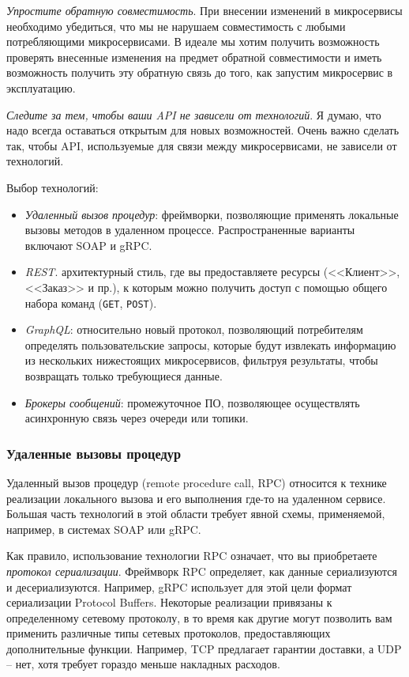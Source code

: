 \documentclass[%
	11pt,
	a4paper,
	utf8,
		]{article}
\begin{document}
\emph{Упростите обратную совместимость}. При внесении изменений в микросервисы необходимо убедиться, что мы не нарушаем совместимость с любыми потребляющими микросервисами. В идеале мы хотим получить возможность проверять внесенные изменения на предмет обратной совместимости и иметь возможность получить эту обратную связь до того, как запустим микросервис в эксплуатацию.

\emph{Следите за тем, чтобы ваши API не зависели от технологий}. Я думаю, что надо всегда оставаться открытым для новых возможностей. Очень важно сделать так, чтобы API, используемые для связи между микросервисами, не зависели от технологий.

Выбор технологий:
\begin{itemize}
	\item \emph{Удаленный вызов процедур}: фреймворки, позволяющие применять локальные вызовы методов в удаленном процессе. Распространенные варианты включают SOAP и gRPC.
	
	\item \emph{REST}. архитектурный стиль, где вы предоставляете ресурсы (<<Клиент>>, <<Заказ>> и пр.), к которым можно получить доступ с помощью общего набора команд (\verb|GET|, \verb|POST|).
	
	\item \emph{GraphQL}: относительно новый протокол, позволяющий потребителям определять пользовательские запросы, которые будут извлекать информацию из нескольких нижестоящих микросервисов, фильтруя результаты, чтобы возвращать только требующиеся данные.
	
	\item \emph{Брокеры сообщений}: промежуточное ПО, позволяющее осуществлять асинхронную связь через очереди или топики.
\end{itemize}

\subsubsection{Удаленные вызовы процедур}

Удаленный вызов процедур (remote procedure call, RPC) относится к технике реализации локального вызова и его выполнения где-то на удаленном сервисе. Большая часть технологий в этой области требует явной схемы, применяемой, например, в системах SOAP или gRPC.

Как правило, использование технологии RPC означает, что вы приобретаете \emph{протокол сериализации}. Фреймворк RPC определяет, как данные сериализуются и десериализуются. Например, gRPC использует для этой цели формат сериализации Protocol Buffers. Некоторые реализации привязаны к определенному сетевому протоколу, в то время как другие могут позволить вам применить различные типы сетевых протоколов, предоставляющих дополнительные функции. Например, TCP предлагает гарантии доставки, а UDP -- нет, хотя требует гораздо меньше накладных расходов. 
\end{document}
